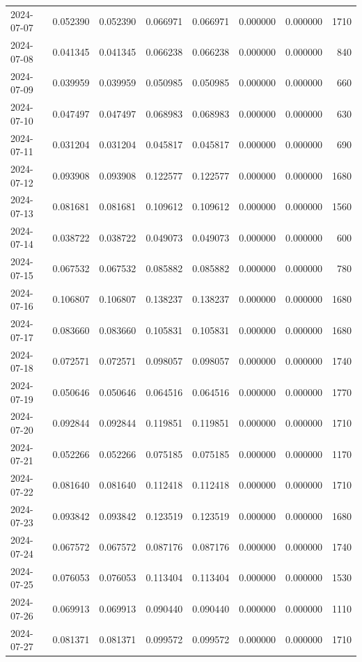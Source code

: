\begin{tabular}{lrrrrrrr}
2024-07-07 & 0.052390 & 0.052390 & 0.066971 & 0.066971 & 0.000000 & 0.000000 & 1710 \\
2024-07-08 & 0.041345 & 0.041345 & 0.066238 & 0.066238 & 0.000000 & 0.000000 & 840 \\
2024-07-09 & 0.039959 & 0.039959 & 0.050985 & 0.050985 & 0.000000 & 0.000000 & 660 \\
2024-07-10 & 0.047497 & 0.047497 & 0.068983 & 0.068983 & 0.000000 & 0.000000 & 630 \\
2024-07-11 & 0.031204 & 0.031204 & 0.045817 & 0.045817 & 0.000000 & 0.000000 & 690 \\
2024-07-12 & 0.093908 & 0.093908 & 0.122577 & 0.122577 & 0.000000 & 0.000000 & 1680 \\
2024-07-13 & 0.081681 & 0.081681 & 0.109612 & 0.109612 & 0.000000 & 0.000000 & 1560 \\
2024-07-14 & 0.038722 & 0.038722 & 0.049073 & 0.049073 & 0.000000 & 0.000000 & 600 \\
2024-07-15 & 0.067532 & 0.067532 & 0.085882 & 0.085882 & 0.000000 & 0.000000 & 780 \\
2024-07-16 & 0.106807 & 0.106807 & 0.138237 & 0.138237 & 0.000000 & 0.000000 & 1680 \\
2024-07-17 & 0.083660 & 0.083660 & 0.105831 & 0.105831 & 0.000000 & 0.000000 & 1680 \\
2024-07-18 & 0.072571 & 0.072571 & 0.098057 & 0.098057 & 0.000000 & 0.000000 & 1740 \\
2024-07-19 & 0.050646 & 0.050646 & 0.064516 & 0.064516 & 0.000000 & 0.000000 & 1770 \\
2024-07-20 & 0.092844 & 0.092844 & 0.119851 & 0.119851 & 0.000000 & 0.000000 & 1710 \\
2024-07-21 & 0.052266 & 0.052266 & 0.075185 & 0.075185 & 0.000000 & 0.000000 & 1170 \\
2024-07-22 & 0.081640 & 0.081640 & 0.112418 & 0.112418 & 0.000000 & 0.000000 & 1710 \\
2024-07-23 & 0.093842 & 0.093842 & 0.123519 & 0.123519 & 0.000000 & 0.000000 & 1680 \\
2024-07-24 & 0.067572 & 0.067572 & 0.087176 & 0.087176 & 0.000000 & 0.000000 & 1740 \\
2024-07-25 & 0.076053 & 0.076053 & 0.113404 & 0.113404 & 0.000000 & 0.000000 & 1530 \\
2024-07-26 & 0.069913 & 0.069913 & 0.090440 & 0.090440 & 0.000000 & 0.000000 & 1110 \\
2024-07-27 & 0.081371 & 0.081371 & 0.099572 & 0.099572 & 0.000000 & 0.000000 & 1710 \\

\end{tabular}

